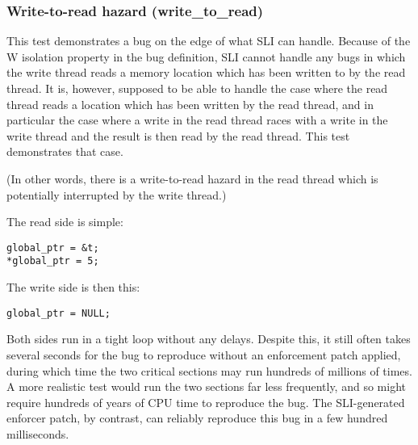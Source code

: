 
\subsubsection{Write-to-read hazard (write\_to\_read)}

This test demonstrates a bug on the edge of what SLI can handle.
Because of the W isolation property in the bug definition, SLI cannot
handle any bugs in which the write thread reads a memory location
which has been written to by the read thread.  It is, however,
supposed to be able to handle the case where the read thread reads a
location which has been written by the read thread, and in particular
the case where a write in the read thread races with a write in the
write thread and the result is then read by the read thread.  This
test demonstrates that case.

(In other words, there is a write-to-read hazard in the read thread
which is potentially interrupted by the write thread.)

The read side is simple:

\begin{verbatim}
global_ptr = &t;
*global_ptr = 5;
\end{verbatim}

The write side is then this:

\begin{verbatim}
global_ptr = NULL;
\end{verbatim}

Both sides run in a tight loop without any delays.  Despite this, it
still often takes several seconds for the bug to reproduce without an
enforcement patch applied, during which time the two critical sections
may run hundreds of millions of times.  A more realistic test would
run the two sections far less frequently, and so might require
hundreds of years of CPU time to reproduce the bug.  The SLI-generated
enforcer patch, by contrast, can reliably reproduce this bug in a few
hundred milliseconds.



